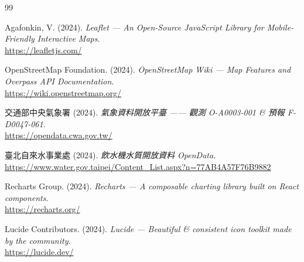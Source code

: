 \documentclass[11pt,a4paper]{article}
\begin{document}

\vspace{2em}
\renewcommand{\refname}{\color{brandDeep}\Large\bfseries 參考文獻\quad References\vspace{-0.2em}\\\color{brand}\rule{\linewidth}{0.6pt}}

\begin{thebibliography}{99}
\small\setlength{\itemsep}{3pt}


 Agafonkin, V. (2024). \emph{Leaflet — An Open-Source JavaScript Library for Mobile-Friendly Interactive Maps}.\\
\url{https://leafletjs.com/}

 OpenStreetMap Foundation. (2024). \emph{OpenStreetMap Wiki — Map Features and Overpass API Documentation}.\\
\url{https://wiki.openstreetmap.org/}

 交通部中央氣象署 (2024). \emph{氣象資料開放平臺 —— 觀測 O-A0003-001 \& 預報 F-D0047-061}.\\
\url{https://opendata.cwa.gov.tw/}

 臺北自來水事業處 (2024). \emph{飲水機水質開放資料 OpenData}.\\
\url{https://www.water.gov.taipei/Content_List.aspx?n=77AB4A57F76B9882}


 Recharts Group. (2024). \emph{Recharts — A composable charting library built on React components}.\\
\url{https://recharts.org/}




 Lucide Contributors. (2024). \emph{Lucide — Beautiful \& consistent icon toolkit made by the community}.\\
\url{https://lucide.dev/}

\end{thebibliography}
\end{document}
